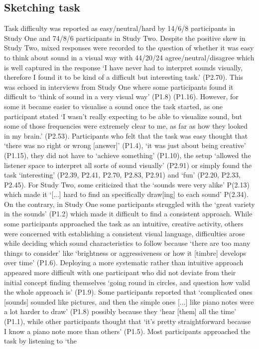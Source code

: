 \documentclass[]{interact}
\theoremstyle{plain}%
\theoremstyle{definition}
\theoremstyle{remark}
\begin{document}

\subsection{Sketching task}
Task difficulty was reported as easy/neutral/hard by 14/6/8 participants in Study One and 74/8/6 participants in Study Two. Despite the positive skew in Study Two, mixed responses were recorded to the question of whether it was easy to think about sound in a visual way with 44/20/24 agree/neutral/disagree which is well captured in the response `I have never had to interpret sounds visually, therefore I found it to be kind of a difficult but interesting task.' (P2.70). This was echoed in interviews from Study One where some participants found it difficult to `think of sound in a very visual way' (P1.8) (P1.16).  However, for some it became easier to visualise a sound once the task started, as one participant stated `I wasn't really expecting to be able to visualize sound, but some of those frequencies were extremely clear to me, as far as how they looked in my brain.' (P2.53). Participants who felt that the task was easy thought that `there was no right or wrong [answer]' (P1.4), `it was just about being creative' (P1.15), they did not have to `achieve something' (P1.10), the setup `allowed the listener space to interpret all sorts of sound visually' (P2.91) or simply found the task `interesting' (P2.39, P2.41, P2.70, P2.83, P2.91) and `fun' (P2.20, P2.33, P2.45). For Study Two, some criticized that the `sounds were very alike' P(2.13) which made it `[...] hard to find an specifically draw[ing] to each sound' P(2.34). On the contrary, in Study One some participants struggled with the `great variety in the sounds' (P1.2) which made it difficult to find a consistent approach. While some participants approached the task as an intuitive, creative activity, others were concerned with establishing a consistent visual language, difficulties arose while deciding which sound characteristics to follow because `there are too many things to consider' like `brightness or aggressiveness or how it [timbre] develops over time' (P1.6).  Deploying a more systematic rather than intuitive approach appeared more difficult with one participant who did not deviate from their initial concept finding themselves `going round in circles, and question how valid the whole approach is' (P1.9). Some participants reported that `complicated ones [sounds] sounded like pictures, and then the simple ones [...] like piano notes were a lot harder to draw' (P1.8) possibly because they `hear [them] all the time' (P1.1), while other participants thought that `it’s pretty straightforward because I know a piano note more than others' (P1.5). Most participants approached the task by listening to `the 
\end{document}
